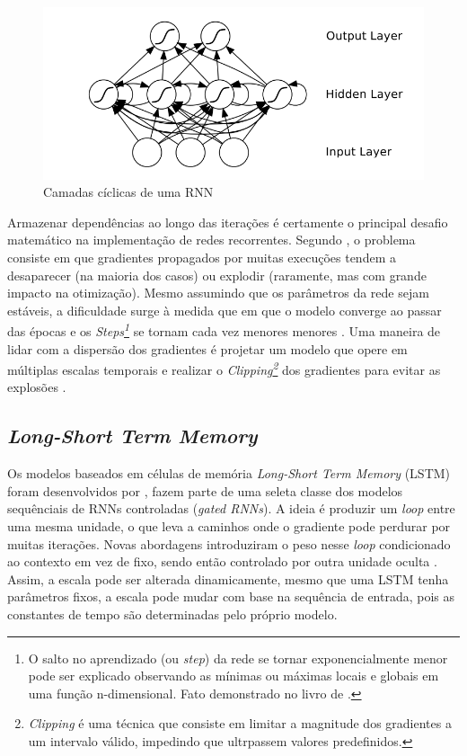 \begin{figure}[!htb] \centering
  \caption{Camadas cíclicas de uma RNN} \label{figura:rnn}
  \begin{varwidth}{\linewidth}
    \includegraphics[width=12cm]{figuras/rnn.png}
  \end{varwidth}
\end{figure}

Armazenar dependências ao longo das iterações é certamente o principal desafio matemático na implementação de redes recorrentes.
Segundo \cite{graves}, o problema consiste em que gradientes propagados por muitas execuções tendem a desaparecer (na maioria dos casos) ou explodir (raramente, mas com grande impacto na otimização).
Mesmo assumindo que os parâmetros da rede sejam estáveis, a dificuldade surge à medida que em que o modelo converge ao passar das épocas e os 
\textit{Steps\footnote{ O salto no aprendizado (ou \textit{step}) da rede se tornar exponencialmente menor pode ser explicado observando as mínimas ou máximas locais e globais em uma função n-dimensional. Fato demonstrado no livro de \textcite{stewart}.}} 
se tornam cada vez menores menores \cite{Good}.
Uma maneira de lidar com a dispersão dos gradientes é projetar um modelo que opere em múltiplas escalas temporais \cite{Bengio} e realizar o 
\textit{Clipping\footnote{\textit{Clipping} é uma técnica que consiste em limitar a magnitude dos gradientes a um intervalo válido, impedindo que ultrpassem valores predefinidos.}} dos gradientes para evitar as explosões \cite{Exp}.

\subsection{\textit{Long-Short Term Memory}} \label{sec:lstm}
Os modelos baseados em células de memória \textit{Long-Short Term Memory} (LSTM) foram desenvolvidos por \textcite{Hoch}, fazem parte de uma seleta classe dos modelos sequênciais de RNNs controladas (\textit{gated RNNs}).
A ideia é produzir um \textit{loop} entre uma mesma unidade, o que leva a caminhos onde o gradiente pode perdurar por muitas iterações.
Novas abordagens introduziram o peso nesse \textit{loop} condicionado ao contexto em vez de fixo, sendo então controlado por outra unidade oculta \cite{Gers}. 
Assim, a escala pode ser alterada dinamicamente, mesmo que uma LSTM tenha parâmetros fixos, a escala pode mudar com base na sequência 
de entrada, pois as constantes de tempo são determinadas pelo próprio modelo.

